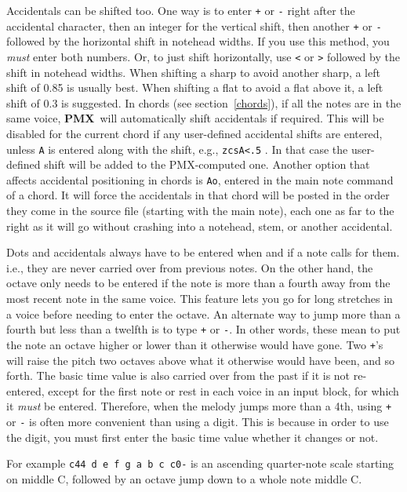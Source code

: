 \documentclass[11pt]{article}
\newcommand\PMXX{\textbf{PMX}}
\newcommand\PMX{\PMXX~}
\def\newfrom{2.59}  %
\def\NEW#1{\ifdim#1 pt<\newfrom pt\else%
\marginpar{\fbox{#1}}\fi}
\begin{document}
\label{AccidentalPosition}
Accidentals \NEW{1.4} can be shifted too.  One way is to enter 
{\tt +} or {\tt -} right after the accidental character, 
then an integer 
for the vertical shift, then another {\tt +} or {\tt -} followed by the 
horizontal shift in notehead widths.  If you use this method, you {\it must}
enter both numbers.  Or, to just shift horizontally, use
{\tt <} or {\tt >} followed by the shift in notehead widths.  When shifting
a sharp to avoid another sharp, a left shift of 0.85 is usually best.  When 
shifting a flat to avoid a flat above it, a left shift of 0.3 is suggested.
In chords (see section~\ref{chords}), if all the notes are in the same \NEW{2.4}voice, 
\PMX will automatically shift accidentals if required. This will be disabled 
for the current chord 
if any user-defined accidental shifts are entered, unless {\tt A} is entered 
along with the shift, e.g., {\tt zcsA<.5} . In that case the user-defined 
shift will be added to the PMX-computed one. 
\NEW{2.4} Another option that affects accidental positioning in 
chords is {\tt Ao},
entered in the main note command of a chord.  It will force the accidentals 
in that chord will be posted in the order
they come in the source file (starting with the main note), each one as far
to the right as it will go without crashing into a notehead, stem, or
another accidental. 


  Dots and accidentals always have to be entered when and if a note 
calls for them. i.e., they are never carried over from previous notes.  
On the other hand, the octave only needs to be entered if the note is 
more than a fourth away from the most recent note in the same voice.  
This feature lets you go for long stretches in a voice before needing 
to enter the octave.  An alternate way to jump more than a fourth but 
less than a twelfth is to type {\tt +} or {\tt -}.  In other words, these 
mean to put the note an octave higher or lower than it 
otherwise would have gone.  Two {\tt +}'s will raise the pitch two octaves 
above what it otherwise would have been, and so forth.  
The basic time 
value is also carried over from the past if it is not re-entered,   
except for the first note or rest in each voice in an input block, 
for which it {\it must} be entered.   
Therefore, when the melody jumps more than a 4th, using {\tt +} or {\tt -} is 
often more convenient than using a digit.  This is because in order to 
use the digit, you must first enter the basic time value whether it 
changes or not.  

	For example {\tt c44 d e f g a b c c0-} is an ascending quarter-note  
scale starting on middle C, followed by an octave jump down to a 
whole note middle C.  
\end{document}
